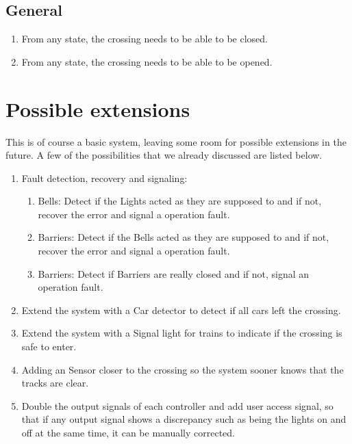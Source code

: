 \documentclass[final]{report}
\begin{document}
\subsection{General}
	\begin{enumerate}
	\item From any state, the crossing needs to be able to be closed.
	\item From any state, the crossing needs to be able to be opened.
	\end{enumerate}


\section{Possible extensions}
This is of course a basic system, leaving some room for possible extensions in the future.
A few of the possibilities that we already discussed are listed below.

	\begin{enumerate}
	\item Fault detection, recovery and signaling:
		\begin{enumerate}
			\item Bells: Detect if the Lights acted as they are supposed to and if not, recover the error and signal a operation fault.
			\item Barriers: Detect if the Bells acted as they are supposed to and if not, recover the error and signal a operation fault.
			\item Barriers: Detect if Barriers are really closed and if not, signal an operation fault.
		\end{enumerate}

	\item Extend the system with a Car detector to detect if all cars left the crossing.
	\item Extend the system with a Signal light for trains to indicate if the crossing is safe to enter.
	\item Adding an Sensor closer to the crossing so the system sooner knows that the tracks are clear.
	\item Double the output signals of each controller and add user access signal, so that if any output signal shows a discrepancy such as being the lights on and off at the same time, it can be manually corrected.
	\end{enumerate}
\end{document}
